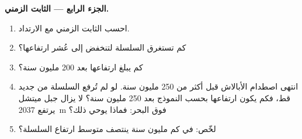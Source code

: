 \begin{problem}
\medskip
\noindent\textbf{الجزء الرابع --- الثابت الزمني.}
\begin{enumerate}[resume]
  \item احسب الثابت الزمني مع الارتداد.
  \item كم تستغرق السلسلة لتنخفض إلى عُشر ارتفاعها؟
  \item كم يبلغ ارتفاعها بعد 200 مليون سنة؟
  \item انتهى اصطدام الأبالاش قبل أكثر من 250 مليون سنة.
        لو لم تُرفع السلسلة من جديد قط، فكم يكون ارتفاعها بحسب النموذج
        بعد 250 مليون سنة؟ لا يزال جبل ميتشل يرتفع \qty{2037}{m}
        فوق البحر: فماذا يوحي ذلك؟
  \item لخّص: في كم مليون سنة ينتصف متوسط ارتفاع
        السلسلة؟
\end{enumerate}
\end{problem}
